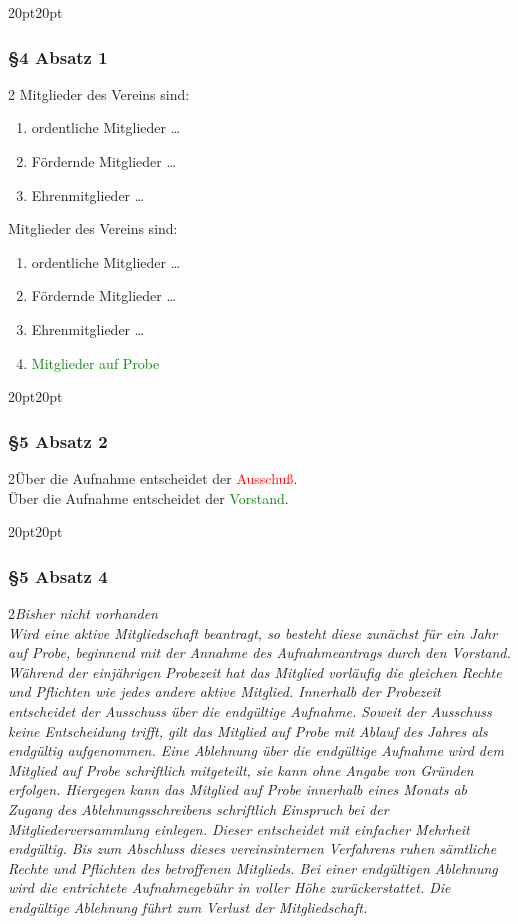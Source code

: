 \documentclass[10pt,a4paper,parskip=half]{scrartcl}
\newcommand{\new}[1]{\textcolor{Green}{#1}}
\newcommand{\old}[1]{\textcolor{Red}{#1}}
\newcommand{\change}[1]{
  \begin{adjustwidth}{20pt}{20pt}
    #1
  \end{adjustwidth}
}
\newcommand{\compare}[3]{\change{\subsubsection*{#1}\begin{multicols}{2}#2\columnbreak\\#3\end{multicols}}}
\begin{document}
  \change{
  \subsubsection*{§4 Absatz 1}
  \begin{multicols}{2}
    Mitglieder des Vereins sind:
    \begin{enumerate}[noitemsep]
      \item ordentliche Mitglieder \dots
      \item Fördernde Mitglieder \dots 
      \item Ehrenmitglieder \dots
    \end{enumerate}
    \columnbreak
    Mitglieder des Vereins sind:
    \begin{enumerate}[noitemsep]
      \item ordentliche Mitglieder \dots
      \item Fördernde Mitglieder \dots 
      \item Ehrenmitglieder \dots
      \item \new{Mitglieder auf Probe}
    \end{enumerate}
    \end{multicols}
  }

    \compare{§5 Absatz 2}{Über die Aufnahme entscheidet der \old{Ausschuß}.}{Über die Aufnahme entscheidet der \new{Vorstand}.}
    \clearpage
    \compare{§5 Absatz 4}{\em Bisher nicht vorhanden \em}{Wird eine aktive Mitgliedschaft beantragt,
    so besteht diese zunächst für ein Jahr auf Probe,
    beginnend mit der Annahme des Aufnahmeantrags durch den Vorstand.
    Während der einjährigen Probezeit hat das Mitglied vorläufig die gleichen Rechte und Pflichten wie jedes andere aktive Mitglied.
    Innerhalb der Probezeit entscheidet der Ausschuss über die endgültige Aufnahme.
    Soweit der Ausschuss keine Entscheidung trifft,
    gilt das Mitglied auf Probe mit Ablauf des Jahres als endgültig aufgenommen.
    Eine Ablehnung über die endgültige Aufnahme wird dem Mitglied auf Probe schriftlich mitgeteilt,
    sie kann ohne Angabe von Gründen erfolgen.
    Hiergegen kann das Mitglied auf Probe innerhalb eines Monats ab Zugang des Ablehnungsschreibens schriftlich Einspruch bei der Mitgliederversammlung einlegen.
    Dieser entscheidet mit einfacher Mehrheit endgültig.
    Bis zum Abschluss dieses vereinsinternen Verfahrens ruhen sämtliche Rechte und Pflichten des betroffenen Mitglieds.
    Bei einer endgültigen Ablehnung wird die entrichtete Aufnahmegebühr in voller Höhe zurückerstattet.
    Die endgültige Ablehnung führt zum Verlust der Mitgliedschaft.}
\end{document}
